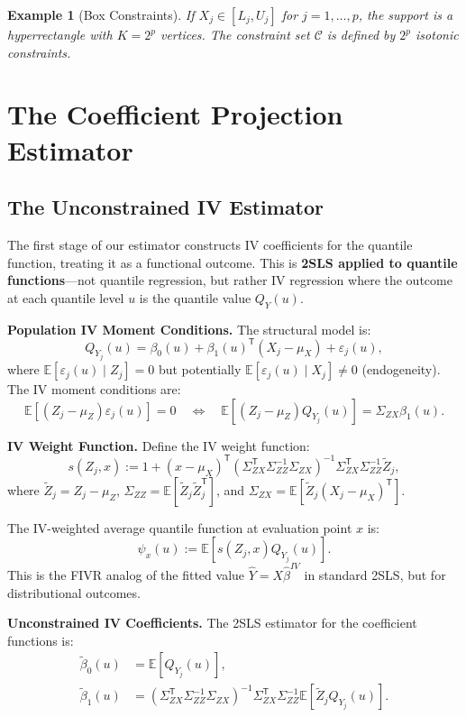 \documentclass[12pt]{article}
\newcommand{\E}{\mathbb{E}}
\newcommand{\T}{\mathsf{T}}
\newtheorem{example}{Example}
\begin{document}
\begin{example}[Box Constraints]
If $X_j \in [L_j, U_j]$ for $j=1,\dots,p$, the support is a hyperrectangle with $K=2^p$ vertices. The constraint set $\mathcal{C}$ is defined by $2^p$ isotonic constraints.
\end{example}

\section{The Coefficient Projection Estimator}

\subsection{The Unconstrained IV Estimator}

The first stage of our estimator constructs IV coefficients for the quantile function, treating it as a functional outcome. This is \textbf{2SLS applied to quantile functions}---not quantile regression, but rather IV regression where the outcome at each quantile level $u$ is the quantile value $Q_Y(u)$.

\textbf{Population IV Moment Conditions.} The structural model is:
\[
Q_{Y_j}(u) = \beta_0(u) + \beta_1(u)^\T (X_j - \mu_X) + \varepsilon_j(u),
\]
where $\E[\varepsilon_j(u) \mid Z_j] = 0$ but potentially $\E[\varepsilon_j(u) \mid X_j] \neq 0$ (endogeneity). The IV moment conditions are:
\[
\E[(Z_j - \mu_Z) \varepsilon_j(u)] = 0 \quad \Leftrightarrow \quad \E[(Z_j - \mu_Z) Q_{Y_j}(u)] = \Sigma_{ZX} \beta_1(u).
\]

\textbf{IV Weight Function.} Define the IV weight function:
\begin{equation}\label{eq:iv-weights}
s(Z_j, x) := 1 + (x-\mu_X)^\T (\Sigma_{ZX}^\T\Sigma_{ZZ}^{-1}\Sigma_{ZX})^{-1} \Sigma_{ZX}^\T\Sigma_{ZZ}^{-1} \tilde{Z}_j,
\end{equation}
where $\tilde{Z}_j = Z_j - \mu_Z$, $\Sigma_{ZZ} = \E[\tilde{Z}_j\tilde{Z}_j^\T]$, and $\Sigma_{ZX} = \E[\tilde{Z}_j(X_j-\mu_X)^\T]$.

The IV-weighted average quantile function at evaluation point $x$ is:
\begin{equation}\label{eq:psi-weighted}
\psi_x(u) := \E[s(Z_j, x) Q_{Y_j}(u)].
\end{equation}
This is the FIVR analog of the fitted value $\hat{Y} = X\hat{\beta}^{IV}$ in standard 2SLS, but for distributional outcomes.

\textbf{Unconstrained IV Coefficients.} The 2SLS estimator for the coefficient functions is:
\begin{align}
\tilde{\beta}_0(u) &= \E[Q_{Y_j}(u)], \label{eq:beta0-iv}\\
\tilde{\beta}_1(u) &= (\Sigma_{ZX}^\T\Sigma_{ZZ}^{-1}\Sigma_{ZX})^{-1} \Sigma_{ZX}^\T\Sigma_{ZZ}^{-1} \E[\tilde{Z}_j Q_{Y_j}(u)]. \label{eq:beta1-iv}
\end{align}
\end{document}
